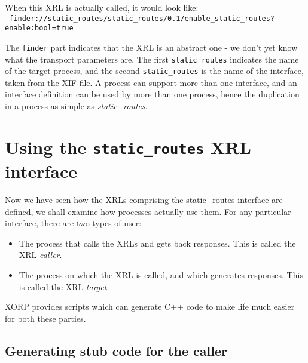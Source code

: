 \documentclass[11pt]{article}
\newcommand{\stt}{\tt\small}
\newcommand{\SR}{{\tt\small static\_routes}\xspace}
\newcommand{\SRI}{{\it static\_routes}\xspace}
\begin{document}
\vspace{0.1in}
\noindent
When this XRL is actually called, it would look like:\\
{\tt\small
  finder://static\_routes/static\_routes/0.1/enable\_static\_routes?enable:bool=true}

\vspace{0.1in} The {\stt finder} part indicates that the XRL is an
abstract one - we don't yet know what the transport parameters are.
The first \SR indicates the name of the target process, and the second
\SR is the name of the interface, taken from the XIF
file.  A process can support more than one interface, and an interface
definition can be used by more than one process, hence the duplication
in a process as simple as \SRI.

\newpage
\section{Using the {\tt static\_routes} XRL interface}

Now we have seen how the XRLs comprising the static\_routes interface
are defined, we shall examine how processes actually use them.  For
any particular interface, there are two types of user:
\begin{itemize}
\item The process that calls the XRLs and gets back responses.  This
is called the XRL {\it caller}.
\item The process on which the XRL is called, and which generates
responses.  This is called the XRL {\it target}.
\end{itemize}
XORP provides scripts which can generate C++ code to make life much
easier for both these parties.

\subsection{Generating stub code for the caller}
\end{document}

